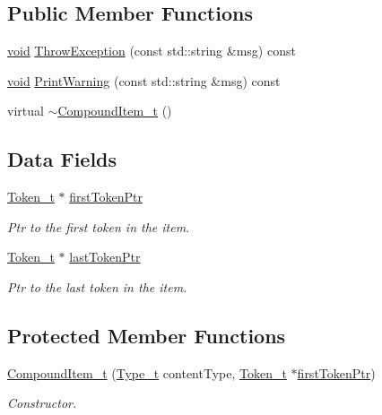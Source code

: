 \subsection*{Public Member Functions}
\begin{DoxyCompactItemize}
\item 
\hyperlink{_t_e_m_p_l_a_t_e__cdef_8h_ac9c84fa68bbad002983e35ce3663c686}{void} \hyperlink{structparse_tree_1_1_compound_item__t_a8f0641d9c3dd7799376efa1cf8915834}{Throw\+Exception} (const std\+::string \&msg) const 
\item 
\hyperlink{_t_e_m_p_l_a_t_e__cdef_8h_ac9c84fa68bbad002983e35ce3663c686}{void} \hyperlink{structparse_tree_1_1_compound_item__t_abc0240204acca8313b96fcaf8a6d86f9}{Print\+Warning} (const std\+::string \&msg) const 
\item 
virtual \hyperlink{structparse_tree_1_1_compound_item__t_a05cb02c49448805ae3dc01edec9e435f}{$\sim$\+Compound\+Item\+\_\+t} ()
\end{DoxyCompactItemize}
\subsection*{Data Fields}
\begin{DoxyCompactItemize}
\item 
\hyperlink{structparse_tree_1_1_token__t}{Token\+\_\+t} $\ast$ \hyperlink{structparse_tree_1_1_compound_item__t_a587020c943e760cb0152dd8cd31e21ef}{first\+Token\+Ptr}
\begin{DoxyCompactList}\small\item\em Ptr to the first token in the item. \end{DoxyCompactList}\item 
\hyperlink{structparse_tree_1_1_token__t}{Token\+\_\+t} $\ast$ \hyperlink{structparse_tree_1_1_compound_item__t_aa6fedf65975afb0cbe1d6e952e71c6e3}{last\+Token\+Ptr}
\begin{DoxyCompactList}\small\item\em Ptr to the last token in the item. \end{DoxyCompactList}\end{DoxyCompactItemize}
\subsection*{Protected Member Functions}
\begin{DoxyCompactItemize}
\item 
\hyperlink{structparse_tree_1_1_compound_item__t_a7ce3b02a11f1ae28a5a5739ca954ce76}{Compound\+Item\+\_\+t} (\hyperlink{structparse_tree_1_1_content__t_a45cc4a193beac87a2045a2f6b6870d1b}{Type\+\_\+t} content\+Type, \hyperlink{structparse_tree_1_1_token__t}{Token\+\_\+t} $\ast$\hyperlink{structparse_tree_1_1_compound_item__t_a587020c943e760cb0152dd8cd31e21ef}{first\+Token\+Ptr})
\begin{DoxyCompactList}\small\item\em Constructor. \end{DoxyCompactList}\end{DoxyCompactItemize}
